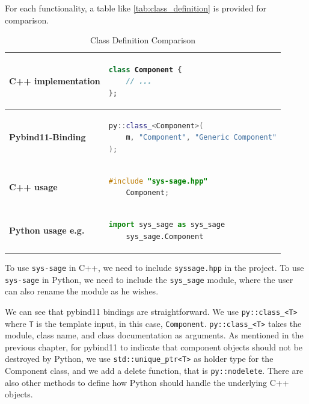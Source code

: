 For each functionality, a table like \autoref{tab:class_definition} is provided for comparison.
        
\begin{table}[ht]
\centering
\begin{tabular}{|l|l|}
\hline
\textbf{C++ implementation} &
\begin{lstlisting}[language=C++]
class Component {
    // ...
};
\end{lstlisting}
\\ \hline
\textbf{Pybind11-Binding} &
\begin{lstlisting}[language=C++]
py::class_<Component>(
    m, "Component", "Generic Component"
);
\end{lstlisting}
\\ \hline
\textbf{C++ usage} &
\begin{lstlisting}[language=C++]
    #include "sys-sage.hpp"
    Component;
\end{lstlisting}
    \\ \hline
\textbf{Python usage e.g.} &
\begin{lstlisting}[language=Python]
    import sys_sage as sys_sage
    sys_sage.Component
    \end{lstlisting}
    \\ \hline
\end{tabular}
\caption{Class Definition Comparison}
\label{tab:class_definition}
\end{table}

To use \verb|sys-sage| in C++, we need to include \verb|syssage.hpp| in the project. To use \verb|sys-sage| in Python, we need to include the \verb|sys_sage| module, where the user can also rename the module as he wishes. 

We can see that pybind11 bindings are straightforward. We use \verb|py::class_<T>| where \verb|T| is the template input, in this case, \verb|Component|. \verb|py::class_<T>| takes the module, class name, and class documentation as arguments. As mentioned in the previous chapter, for pybind11 to indicate that component objects should not be destroyed by Python, we use \verb|std::unique_ptr<T>| as holder type for the Component class, and we add a delete function, that is \verb|py::nodelete|. There are also other methods to define how Python should handle the underlying C++ objects. \cite[see The Basics/Object-Oriented Code]{pybind11-docu}



